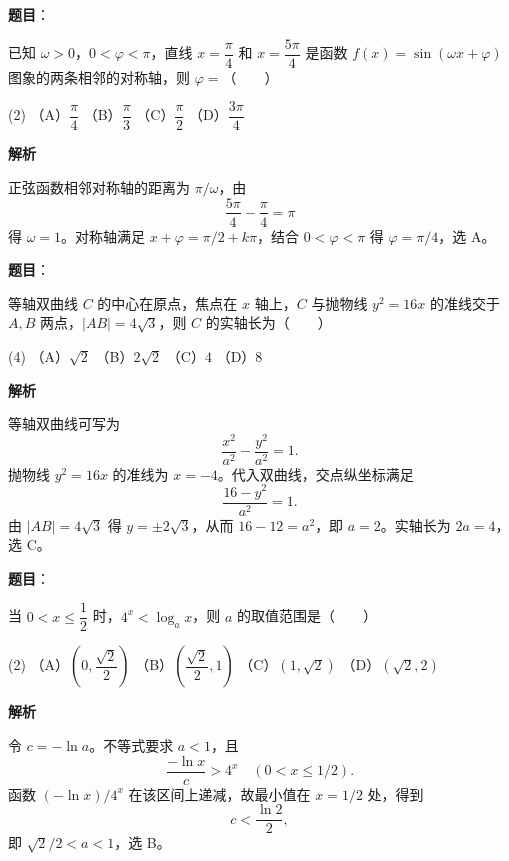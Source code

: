 \begin{answer}

\textbf{题目}：

已知 $\omega>0$，$0<\varphi<\pi$，直线 $x=\dfrac\pi4$ 和 $x=\dfrac{5\pi}4$ 是函数 $f(x)=\sin(\omega x+\varphi)$ 图象的两条相邻的对称轴，则 $\varphi=$\mbox{（　　）}

\begin{gkopts}(2)
\task （A）$\dfrac\pi4$
\task （B）$\dfrac\pi3$
\task （C）$\dfrac\pi2$
\task （D）$\dfrac{3\pi}4$
\end{gkopts}

\textbf{解析}

正弦函数相邻对称轴的距离为 $\pi/\omega$，由
\nopagebreak[4]
\[
\frac{5\pi}4-\frac\pi4=\pi
\]
得 $\omega=1$。对称轴满足 $x+\varphi=\pi/2+k\pi$，结合 $0<\varphi<\pi$ 得 $\varphi=\pi/4$，选 A。


\end{answer}
\begin{answer}

\textbf{题目}：

等轴双曲线 $C$ 的中心在原点，焦点在 $x$ 轴上，$C$ 与抛物线 $y^2=16x$ 的准线交于 $A,B$ 两点，$|AB|=4\sqrt3$，则 $C$ 的实轴长为\mbox{（　　）}

\begin{gkopts}(4)
\task （A）$\sqrt2$
\task （B）$2\sqrt2$
\task （C）$4$
\task （D）$8$
\end{gkopts}

\textbf{解析}

等轴双曲线可写为
\nopagebreak[4]
\[
\frac{x^2}{a^2}-\frac{y^2}{a^2}=1.
\]
抛物线 $y^2=16x$ 的准线为 $x=-4$。代入双曲线，交点纵坐标满足
\nopagebreak[4]
\[
\frac{16-y^2}{a^2}=1.
\]
由 $|AB|=4\sqrt3$ 得 $y=\pm2\sqrt3$，从而 $16-12=a^2$，即 $a=2$。实轴长为 $2a=4$，选 C。


\end{answer}
\begin{answer}

\textbf{题目}：

当 $0<x\leqslant\dfrac12$ 时，$4^x<\log_a x$，则 $a$ 的取值范围是\mbox{（　　）}

\begin{gkopts}(2)
\task （A）$\left(0,\dfrac{\sqrt2}{2}\right)$
\task （B）$\left(\dfrac{\sqrt2}{2},1\right)$
\task （C）$(1,\sqrt2)$
\task （D）$(\sqrt2,2)$
\end{gkopts}

\textbf{解析}

令 $c=-\ln a$。不等式要求 $a<1$，且
\nopagebreak[4]
\[
\frac{-\ln x}{c}>4^x\quad(0<x\leqslant1/2).
\]
函数 $(-\ln x)/4^x$ 在该区间上递减，故最小值在 $x=1/2$ 处，得到
\nopagebreak[4]
\[
c<\frac{\ln2}{2},
\]
即 $\sqrt2/2<a<1$，选 B。


\end{answer}
